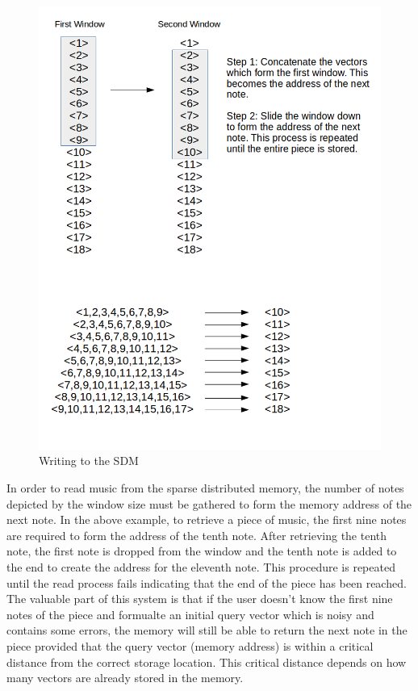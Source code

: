 \begin{figure}
  \begin{center}
    \includegraphics[scale=.75]{resources/sdmSave.png}
    \caption{Writing to the SDM}
    \label{fig:writingToSDM}
  \end{center}
\end{figure}

In order to read music from the sparse distributed memory, the number of notes depicted by the window size must be gathered to form the memory address of the next note. In the above example, to retrieve a piece of music, the first nine notes are required to form the address of the tenth note. After retrieving the tenth note, the first note is dropped from the window and the tenth note is added to the end to create the address for the eleventh note. This procedure is repeated until the read process fails indicating that the end of the piece has been reached. The valuable part of this system is that if the user doesn't know the first nine notes of the piece and formualte an initial query vector which is noisy and contains some errors, the memory will still be able to return the next note in the piece provided that the query vector (memory address) is within a critical distance from the correct storage location. This critical distance depends on how many vectors are already stored in the memory.

